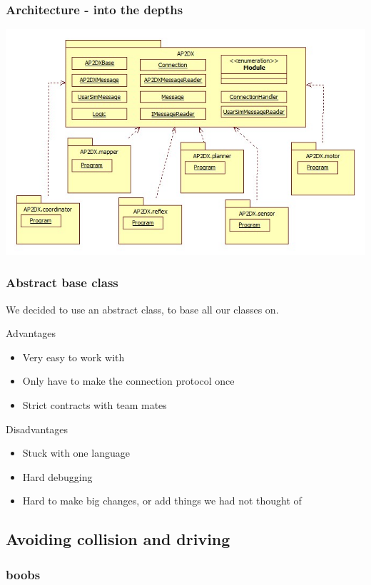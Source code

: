 \documentclass{beamer}
\begin{document}
\begin{frame}
\frametitle{Architecture - into the depths}
\includegraphics[width=.8\paperwidth]{AP2DX}
\end{frame}

\begin{frame}
\frametitle{Abstract base class}
We decided to use an abstract class, to base all our classes on.
\begin{block}{Advantages}
\begin{itemize}
\item Very easy to work with
\item Only have to make the connection protocol once
\item Strict contracts with team mates
\end{itemize}
\end{block}
\begin{block}{Disadvantages}
\begin{itemize}
\item Stuck with one language
\item Hard debugging
\item Hard to make big changes, or add things we had not thought of
\end{itemize}
\end{block}
\end{frame}

\subsection{Avoiding collision and driving}
\begin{frame}
\frametitle{boobs}
\end{frame}
\end{document}
